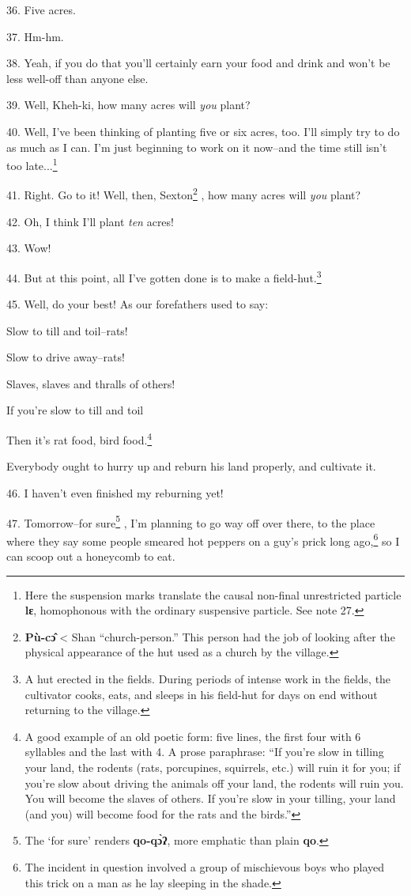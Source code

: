 36. Five acres.

37. Hm-hm.

38. Yeah, if you do that you'll certainly earn your food and drink and won't be
less well-off than anyone else.

39. Well, Kheh-ki, how many acres will \textit{you} plant?

40. Well, I've been thinking of planting five or six acres, too. I'll simply try
to do as much as I can. I'm just beginning to work on it now--and the time still
isn't too late...\footnote{Here the suspension marks translate the causal non-final unrestricted particle \textbf{lɛ}, homophonous with the ordinary suspensive particle. See note 27.}

41. Right. Go to it! Well, then, Sexton\footnote{\textbf{Pù-cɔ̂} < Shan ``church-person.'' This person had the job of looking after the physical appearance of the hut used as a church by the village.} , how many acres will \textit{you}
plant?

42. Oh, I think I'll plant \textit{ten} acres!

43. Wow!

44. But at this point, all I've gotten done is to make a field-hut.\footnote{A hut erected in the fields. During periods of intense work in the fields, the cultivator cooks, eats, and sleeps in his field-hut for days on end without returning to the village.}

45. Well, do your best! As our forefathers used to say:

Slow to till and toil--rats!

Slow to drive away--rats!

Slaves, slaves and thralls of others!

If you're slow to till and toil

Then it's rat food, bird food.\footnote{A good example of an old poetic form: five lines, the first four with 6 syllables and the last with 4. A prose paraphrase: ``If you're slow in tilling your land, the rodents (rats, porcupines, squirrels, etc.) will ruin it for you; if you're slow about driving the animals off your land, the rodents will ruin you. You will become the slaves of others. If you're slow in your tilling, your land (and you) will become food for the rats and the birds.''}

Everybody ought to hurry up and reburn his land properly, and cultivate it.

46. I haven't even finished my reburning yet!

47. Tomorrow--for sure\footnote{The `for sure' renders \textbf{qo-qɔ̀ʔ}, more emphatic than plain \textbf{qo}.} , I'm planning to go way off over there, to the place
where they say some people smeared hot peppers on a guy's prick long ago,\footnote{The incident in question involved a group of mischievous boys who played this trick on a man as he lay sleeping in the shade.}
so I can scoop out a honeycomb to eat.

